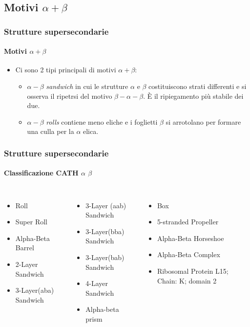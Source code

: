 \documentclass{beamer}
\begin{document}
\subsection{Motivi $\alpha+\beta$}
\begin{frame}
\frametitle{Strutture supersecondarie}
  \framesubtitle{Motivi $\alpha+\beta$}
\begin{itemize}\item Ci sono 2 tipi principali di motivi $\alpha+\beta$\citep{aplusb}:
\begin{itemize}
\pause   \item $\alpha-\beta$ \emph{sandwich} in cui le strutture $\alpha$ e $\beta$ costituiscono strati differenti e si osserva il ripetrsi del motivo $\beta-\alpha-\beta$. È il ripiegamento più stabile dei due.
\pause   \item $\alpha-\beta$ \emph{rolls} contiene meno eliche e i foglietti $\beta$ si arrotolano per formare una culla per la $\alpha$ elica.
\end{itemize}

\end{itemize}
\end{frame}

\begin{frame}
 \frametitle{Strutture supersecondarie}
  \framesubtitle{Classificazione CATH $\alpha$ $\beta$ }
\begin{columns}
\begin{itemize}
 \item Roll
 \item Super Roll
 \item Alpha-Beta Barrel
 \item 2-Layer Sandwich
 \item 3-Layer(aba) Sandwich
\end{itemize}
\begin{itemize}
 \item 3-Layer (aab) Sandwich
 \item 3-Layer(bba) Sandwich
 \item 3-Layer(bab) Sandwich
 \item 4-Layer Sandwich
 \item Alpha-beta prism
\end{itemize}\begin{itemize}
 \item Box
 \item 5-stranded Propeller
 \item Alpha-Beta Horseshoe
 \item Alpha-Beta Complex
 \item Ribosomal Protein L15; Chain: K; domain 2
\end{itemize}
\end{columns}
\end{frame}
\end{document}
